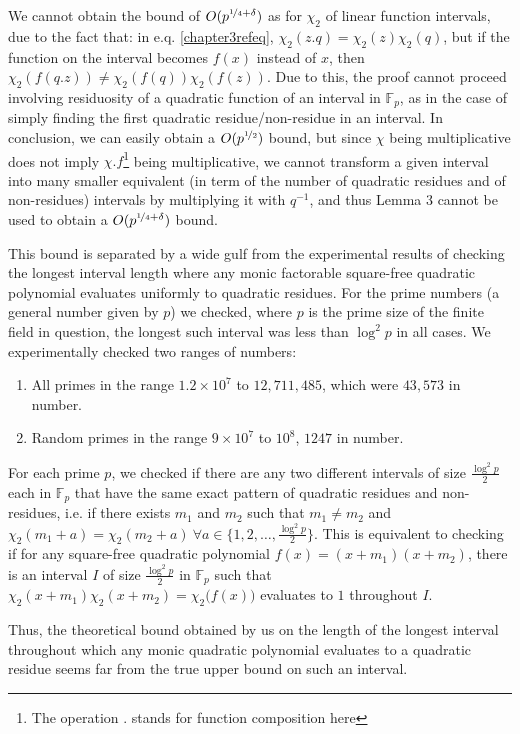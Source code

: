 \documentclass{report}
\begin{document}
\renewcommand{\thefootnote}{\fnsymbol{footnote}}
We cannot obtain the bound of $O(p^{\nicefrac{1}{4}+\delta})$ as for $\chi_2$ of linear function intervals, due to the fact that: in e.q. \ref{chapter3refeq}, $\chi_2(z.q)=\chi_2(z)\chi_2(q)$, but if the function on the interval becomes $f(x)$ instead of $x$, then $\chi_2(f(q.z))\neq \chi_2(f(q))\chi_2(f(z))$. Due to this, the proof cannot proceed involving residuosity of a quadratic function of an interval in $\mathbb{F}_p$, as in the case of simply finding the first quadratic residue/non-residue in an interval. In conclusion, we can easily obtain a $O(p^{\nicefrac{1}{2}})$ bound, but since $\chi$ being multiplicative does not imply $\chi.f$\footnote[2]{The operation $.$ stands for function composition here} being multiplicative, we cannot transform a given interval into many smaller equivalent (in term of the number of quadratic residues and of non-residues) intervals by multiplying it with $q^{-1}$, and thus Lemma 3 cannot be used to obtain a $O(p^{\nicefrac{1}{4}+\delta})$ bound.

This bound is separated by a wide gulf from the experimental results of checking the longest interval length where any monic factorable square-free quadratic polynomial evaluates uniformly to quadratic residues. For the prime numbers (a general number given by $p$) we checked, where $p$ is the prime size of the finite field in question, the longest such interval was less than $\log^2 p$ in all cases. We experimentally checked two ranges of numbers:
\begin{enumerate}
    \item All primes in the range $1.2\times10^7$ to $12,711,485$, which were $43,573$ in number.
    \item Random primes in the range $9\times10^7$ to $10^8$, $1247$ in number.
\end{enumerate}
For each prime $p$, we checked if there are any two different intervals of size $\frac{\log^2 p}{2}$ each in $\mathbb{F}_p$ that have the same exact pattern of quadratic residues and non-residues, i.e. if there exists $m_1$ and $m_2$ such that $m_1 \neq m_2$ and $\chi_2(m_1+a)=\chi_2(m_2+a)\ \forall a \in \{1,2,\ldots, \frac{\log^2 p}{2}\}$. This is equivalent to checking if for any square-free quadratic polynomial $f(x)=(x+m_1)(x+m_2)$, there is an interval $I$ of size $\frac{\log^2 p}{2}$ in $\mathbb{F}_p$ such that $\chi_2(x+m_1)\chi_2(x+m_2)=\chi_2 \big(f(x)\big)$ evaluates to $1$ throughout $I$.

Thus, the theoretical bound obtained by us on the length of the longest interval throughout which any monic quadratic polynomial evaluates to a quadratic residue seems far from the true upper bound on such an interval.
\end{document}
